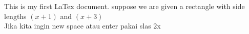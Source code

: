 \documentclass[11pt]{article}
\begin{document}
	This is my first LaTex document. suppose we are given a rectangle with side lengths $(x+1)$ and $(x+3)$
	\\ Jika kita ingin new space atau enter pakai slas 2x
\end{document}
